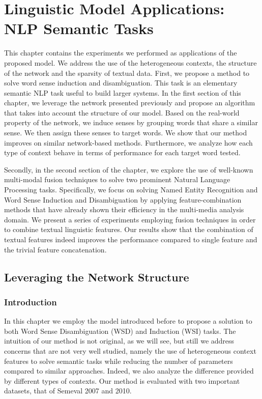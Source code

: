 \chapter{Linguistic Model Applications: NLP Semantic Tasks} 
\label{chap:wsd}
\begin{abstractchap}
This chapter contains the experiments we performed as applications of the proposed model. We address the use of the heterogeneous contexts, the structure of the network and the sparsity of textual data.
First, we propose a method to solve word sense induction and disambiguation. This task is an elementary semantic NLP task useful to build larger systems. In the first section of this chapter, we leverage the network presented previously and propose an algorithm that takes into account the structure of our model. Based on the real-world property of the network, we induce senses by grouping words that share a similar sense. We then assign these senses to target words. We show that our method improves on similar network-based methods. Furthermore, we analyze how each type of context behave in terms of performance for each target word tested.

Secondly, in the second section of the chapter, we explore the use of well-known multi-modal fusion techniques to solve two prominent Natural Language Processing tasks. Specifically, we focus on solving Named Entity Recognition and Word Sense Induction and Disambiguation by applying feature-combination methods that have already shown their efficiency in the multi-media analysis domain. We present a series of experiments employing fusion techniques in order to combine textual linguistic features. Our results show that the combination of textual features indeed improves the performance compared to single feature and the trivial feature concatenation. 

\end{abstractchap}

\minitoc
\section{Leveraging the Network Structure}
\subsection{Introduction}
\label{chap5:intro}
In this chapter we employ the model introduced before to propose a solution to both Word Sense Disambiguation (WSD) and Induction  (WSI) tasks. The intuition of our method is not original, as we will see, but still we address concerns that are not very well studied, namely the use of heterogeneous context features to solve semantic tasks while reducing the number of parameters compared to similar approaches. Indeed, we also analyze the difference provided by different types of contexts. Our method is evaluated with two important datasets, that of Semeval 2007 and 2010.


